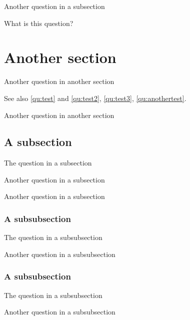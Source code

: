 \documentclass{scrartcl}
\begin{document}
\begin{question}
Another question in a subsection
\end{question}

\begin{question}
What is this question?
\end{question}

\section{Another section}

\begin{question}\label{qu:anothertest}
Another question in another section
\end{question}

See also \ref{qu:test} and \ref{qu:test2}, \ref{qu:test3}, \ref{qu:anothertest}.

\begin{question}
Another question in another section
\end{question}

\subsection{A subsection}

\begin{question}
The question in a subsection
\end{question}

\begin{question}
Another question in a subsection
\end{question}

\begin{question}
Another question in a subsection
\end{question}

\subsubsection{A subsubsection}

\begin{question}
The question in a subsubsection
\end{question}

\begin{question}
Another question in a subsubsection
\end{question}

\subsubsection{A subsubsection}

\begin{question}
The question in a subsubsection
\end{question}

\begin{question}
Another question in a subsubsection
\end{question}
\end{document}
